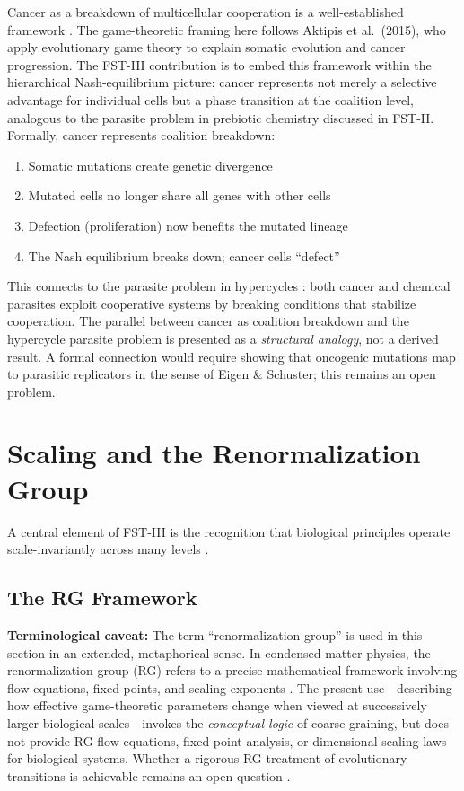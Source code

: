 \documentclass[12pt,a4paper]{article}
\theoremstyle{remark}
\begin{document}
Cancer as a breakdown of multicellular cooperation is a well-established framework \citep{AktipisCancer}. The game-theoretic framing here follows Aktipis et al.\ (2015), who apply evolutionary game theory to explain somatic evolution and cancer progression. The FST-III contribution is to embed this framework within the hierarchical Nash-equilibrium picture: cancer represents not merely a selective advantage for individual cells but a phase transition at the coalition level, analogous to the parasite problem in prebiotic chemistry discussed in FST-II. Formally, cancer represents coalition breakdown:
\begin{enumerate}
    \item Somatic mutations create genetic divergence
    \item Mutated cells no longer share all genes with other cells
    \item Defection (proliferation) now benefits the mutated lineage
    \item The Nash equilibrium breaks down; cancer cells ``defect''
\end{enumerate}

This connects to the parasite problem in hypercycles \citep{FSTII}: both cancer and chemical parasites exploit cooperative systems by breaking conditions that stabilize cooperation. The parallel between cancer as coalition breakdown and the hypercycle parasite problem is presented as a \emph{structural analogy}, not a derived result. A formal connection would require showing that oncogenic mutations map to parasitic replicators in the sense of Eigen \& Schuster; this remains an open problem.

\section{Scaling and the Renormalization Group}
\label{sec:renormalization}

A central element of FST-III is the recognition that biological principles operate scale-invariantly across many levels \citep{ScaleRGFrontiers,ScaleRGResearch}.

\subsection{The RG Framework}

\textbf{Terminological caveat:} The term ``renormalization group'' is used in this section in an extended, metaphorical sense. In condensed matter physics, the renormalization group (RG) refers to a precise mathematical framework involving flow equations, fixed points, and scaling exponents \citep{ScaleRGResearch}. The present use---describing how effective game-theoretic parameters change when viewed at successively larger biological scales---invokes the \emph{conceptual logic} of coarse-graining, but does not provide RG flow equations, fixed-point analysis, or dimensional scaling laws for biological systems. Whether a rigorous RG treatment of evolutionary transitions is achievable remains an open question \citep{ScaleRGFrontiers}.
\end{document}
